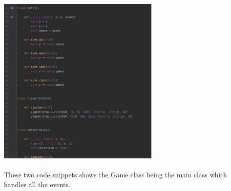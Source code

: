 \documentclass[a4paper, 11pt]{report}
\begin{document}
\includegraphics[width=8cm]{Level B Demo Code1}\\[1cm]
\\

These two code snippets shows the Game class being the main class which handles all the events.

\begin{figure}[!htb]%
    \centering
    \qquad
\end{figure}


\end{document}
